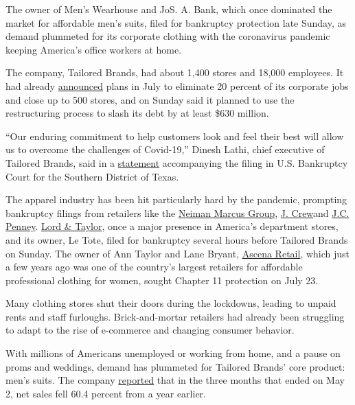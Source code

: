 The owner of Men's Wearhouse and JoS. A. Bank, which once dominated the
market for affordable men's suits, filed for bankruptcy protection late
Sunday, as demand plummeted for its corporate clothing with the
coronavirus pandemic keeping America's office workers at home.

The company, Tailored Brands, had about 1,400 stores and 18,000
employees. It had already
\href{https://www.businesswire.com/news/home/20200721005319/en/Tailored-Brands-Announces-Plans-Reduce-Headcount-Close}{announced}
plans in July to eliminate 20 percent of its corporate jobs and close up
to 500 stores, and on Sunday said it planned to use the restructuring
process to slash its debt by at least \$630 million.

``Our enduring commitment to help customers look and feel their best
will allow us to overcome the challenges of Covid-19,'' Dinesh Lathi,
chief executive of Tailored Brands, said in a
\href{https://www.tailoredstronger.com/wp-content/uploads/2020/08/TLRD-Infographic_08022020.pdf}{statement}
accompanying the filing in U.S. Bankruptcy Court for the Southern
District of Texas.

The apparel industry has been hit particularly hard by the pandemic,
prompting bankruptcy filings from retailers like the
\href{https://www.nytimes3xbfgragh.onion/2020/05/07/business/neiman-marcus-bankruptcy.html}{Neiman
Marcus Group},
\href{https://www.nytimes3xbfgragh.onion/2020/05/03/business/j-crew-bankruptcy-coronavirus.html}{J.
Crew}and
\href{https://www.nytimes3xbfgragh.onion/2020/05/15/business/jc-penney-bankruptcy-coronavirus.html}{J.C.
Penney}.
\href{https://www.nytimes3xbfgragh.onion/2020/08/02/business/Lord-and-Taylor-Bankruptcy.html}{Lord
\& Taylor}, once a major presence in America's department stores, and
its owner, Le Tote, filed for bankruptcy several hours before Tailored
Brands on Sunday. The owner of Ann Taylor and Lane Bryant,
\href{https://www.nytimes3xbfgragh.onion/2020/07/23/business/ascena-bankruptcy-ann-taylor-lane-bryant.html}{Ascena
Retail}, which just a few years ago was one of the country's largest
retailers for affordable professional clothing for women, sought Chapter
11 protection on July 23.

Many clothing stores shut their doors during the lockdowns, leading to
unpaid rents and staff furloughs. Brick-and-mortar retailers had already
been struggling to adapt to the rise of e-commerce and changing consumer
behavior.

With millions of Americans unemployed or working from home, and a pause
on proms and weddings, demand has plummeted for Tailored Brands' core
product: men's suits. The company
\href{https://ir.tailoredbrands.com/press-releases/detail/1893/tailored-brands-inc-provides-business-update-reports}{reported}
that in the three months that ended on May 2, net sales fell 60.4
percent from a year earlier.

